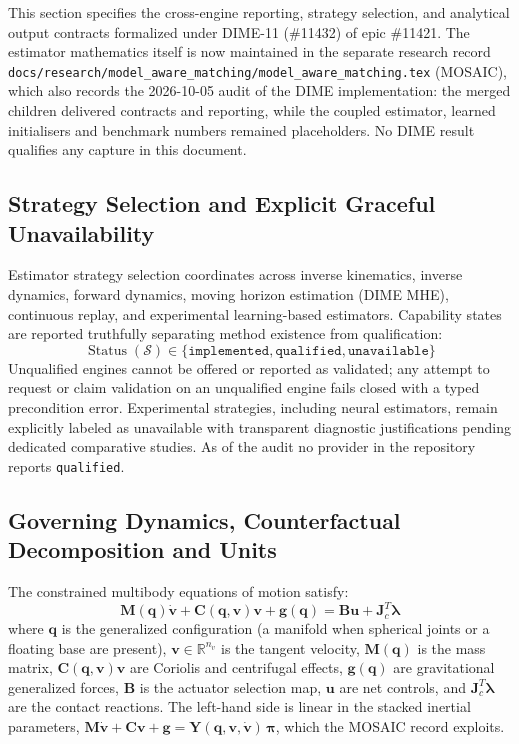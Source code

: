 \documentclass[11pt,a4paper]{article}
\begin{document}
This section specifies the cross-engine reporting, strategy selection, and analytical output contracts formalized under DIME-11 (\#11432) of epic \#11421. The estimator mathematics itself is now maintained in the separate research record \texttt{docs/research/model\_aware\_matching/model\_aware\_matching.tex} (MOSAIC), which also records the 2026-10-05 audit of the DIME implementation: the merged children delivered contracts and reporting, while the coupled estimator, learned initialisers and benchmark numbers remained placeholders. No DIME result qualifies any capture in this document.

\subsection{Strategy Selection and Explicit Graceful Unavailability}
Estimator strategy selection coordinates across inverse kinematics, inverse dynamics, forward dynamics, moving horizon estimation (DIME MHE), continuous replay, and experimental learning-based estimators. Capability states are reported truthfully separating method existence from qualification:
\begin{equation}
\operatorname{Status}(\mathcal{S}) \in \{\mathtt{implemented}, \mathtt{qualified}, \mathtt{unavailable}\}
\end{equation}
Unqualified engines cannot be offered or reported as validated; any attempt to request or claim validation on an unqualified engine fails closed with a typed precondition error. Experimental strategies, including neural estimators, remain explicitly labeled as unavailable with transparent diagnostic justifications pending dedicated comparative studies. As of the audit no provider in the repository reports \texttt{qualified}.

\subsection{Governing Dynamics, Counterfactual Decomposition and Units}
The constrained multibody equations of motion satisfy:
\begin{equation}
\mathbf{M}(\mathbf{q}) \dot{\mathbf{v}} + \mathbf{C}(\mathbf{q}, \mathbf{v})\mathbf{v} + \mathbf{g}(\mathbf{q}) = \mathbf{B}\mathbf{u} + \mathbf{J}_c^T \boldsymbol{\lambda}
\end{equation}
where $\mathbf{q}$ is the generalized configuration (a manifold when spherical joints or a floating base are present), $\mathbf{v} \in \mathbb{R}^{n_v}$ is the tangent velocity, $\mathbf{M}(\mathbf{q})$ is the mass matrix, $\mathbf{C}(\mathbf{q}, \mathbf{v})\mathbf{v}$ are Coriolis and centrifugal effects, $\mathbf{g}(\mathbf{q})$ are gravitational generalized forces, $\mathbf{B}$ is the actuator selection map, $\mathbf{u}$ are net controls, and $\mathbf{J}_c^T \boldsymbol{\lambda}$ are the contact reactions. The left-hand side is linear in the stacked inertial parameters, $\mathbf{M}\dot{\mathbf{v}} + \mathbf{C}\mathbf{v} + \mathbf{g} = \mathbf{Y}(\mathbf{q},\mathbf{v},\dot{\mathbf{v}})\,\boldsymbol{\pi}$, which the MOSAIC record exploits.
\end{document}
